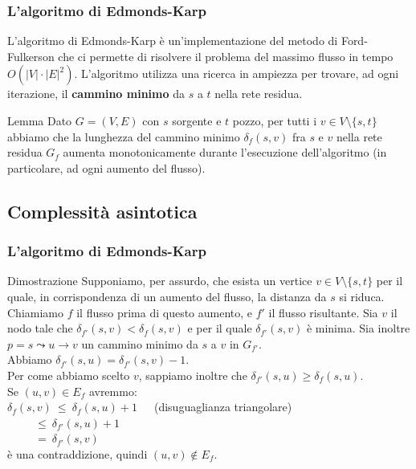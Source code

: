 \documentclass{beamer}
\begin{document}
\begin{frame}
\frametitle{L'algoritmo di Edmonds-Karp}
L'algoritmo di Edmonds-Karp è un'implementazione del metodo di Ford-Fulkerson che ci permette di risolvere il problema del massimo flusso in tempo $O(|V|\cdot|E|^2)$. L'algoritmo utilizza una ricerca in ampiezza per trovare, ad ogni iterazione, il \textbf{cammino minimo} da $s$ a $t$ nella rete residua.
\begin{block}{Lemma}
Dato $G=(V,E)$ con $s$ sorgente e $t$ pozzo, per tutti i $v\in V\setminus\{s,t\}$ abbiamo che la lunghezza del cammino minimo $\delta_f(s,v)$ fra $s$ e $v$ nella rete residua $G_f$ aumenta monotonicamente durante l'esecuzione dell'algoritmo (in particolare, ad ogni aumento del flusso).
\end{block}
\end{frame}

\subsection{Complessità asintotica}

\begin{frame}
\frametitle{L'algoritmo di Edmonds-Karp}
\begin{block}{Dimostrazione}
Supponiamo, per assurdo, che esista un vertice $v\in V\setminus\{s,t\}$ per il quale, in corrispondenza di un aumento del flusso, la distanza da $s$ si riduca. Chiamiamo $f$ il flusso prima di questo aumento, e $f'$ il flusso risultante. Sia $v$ il nodo tale che $\delta_{f'}(s,v)<\delta_f(s,v)$ e per il quale $\delta_{f'}(s,v)$ è minima. Sia inoltre $p=s\leadsto u\rightarrow v$ un cammino minimo da $s$ a $v$ in $G_{f'}$.\\
Abbiamo $\delta_{f'}(s,u)=\delta_{f'}(s,v)-1$.\\
Per come abbiamo scelto $v$, sappiamo inoltre che $\delta_{f'}(s,u)\geq \delta_f(s,u)$.\\
Se $(u,v)\in E_{f}$ avremmo:\\
$\delta_f(s,v)\ \leq\ \delta_f(s,u)+1$\ \ \ (disuguaglianza triangolare)\\
$\ \ \ \ \ \ \ \ \ \ \ \leq\ \delta_{f'}(s,u)+1$\\
$\ \ \ \ \ \ \ \ \ \ \ =\ \delta_{f'}(s,v)$\\
è una contraddizione, quindi $(u,v)\not\in E_f$.
\end{block}
\end{frame}
\end{document}

